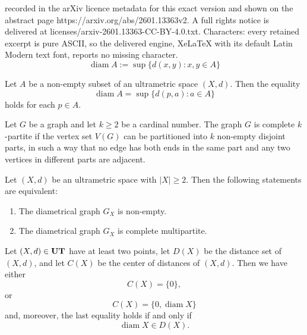 \documentclass[10pt,a4paper]{amsart}
\begin{document}
recorded in the arXiv licence metadata for this exact version and shown on the abstract page https://arxiv.org/abs/2601.13363v2. A full rights notice is delivered at licenses/arxiv-2601.13363-CC-BY-4.0.txt. Characters: every retained excerpt is pure ASCII, so the delivered engine, XeLaTeX with its default Latin Modern text font, reports no missing character.
\begin{equation}\label{lokias}
    \operatorname{diam} A := \sup\{ d(x,y) : x,y \in A \}
\end{equation}

\begin{Lemma}\label{nnhh}
Let $A$ be a non-empty subset of an ultrametric space $(X,d)$. Then the equality
\begin{equation}\label{ssqq}
\operatorname{diam} A=\sup\{d(p,a): a\in A\}
\end{equation}
holds for each $p\in A$.
\end{Lemma}

\begin{Definition}\label{scfr} Let $G$ be a graph and let $k \geq 2$ be a cardinal number. The graph $G$
is complete $k$-partite if the vertex set $V(G)$ can be partitioned into $k$ non-empty
disjoint parts, in such a way that no edge has both ends in the same part and
any two vertices in different parts are adjacent.
\end{Definition}

\begin{Theorem}\label{ref} Let $(X,d)$ be an ultrametric space with $|X| \geq 2$. Then the following
statements are equivalent:

\begin{enumerate}[label=\textit{(\roman*)}, left=0pt]
\item The diametrical graph $G_{X}$ is non-empty.
\item The diametrical graph $G_{X}$ is complete multipartite.
\end{enumerate}

\end{Theorem}

\begin{Theorem}\label{dggkq}
Let $(X,d) \in {\bf UT}$ have at least two points, let $D(X)$ be the distance set of $(X,d)$, and let $C(X)$ be the center of distances of $(X,d)$.
Then
 we have either
\begin{equation}\label{jy1}
    C(X)=\{0\},
\end{equation}
or
\begin{equation}\label{jy2}
    C(X)=\{0,\operatorname{diam}X\}
\end{equation}
and, moreover, the last equality holds if and only if 
\begin{equation}
    \label{er0}
\operatorname{diam} X \in D(X).
\end{equation}




\end{Theorem}
\end{document}
